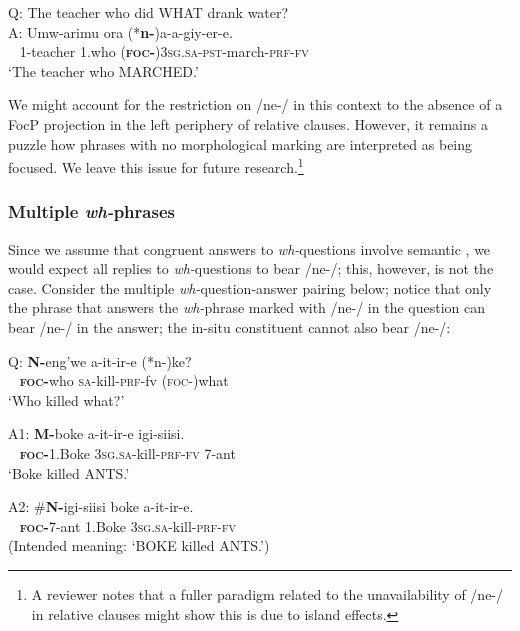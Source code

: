 \documentclass[output=paper,modfonts]{langscibook}
\begin{document}
\ea\label{ex:landmann:46}
Q: The teacher who did WHAT drank water?\\
\gll A: Umw-arimu ora (*\textbf{n-})a-a-giy-er-e.\\
     ~ 1-teacher 1.who (\textsc{\textbf{foc-}})\textsc{3sg}.\textsc{sa}-\textsc{pst}-march-\textsc{prf}-\textsc{fv}\\
\glt ‘The teacher who MARCHED.’
\z

We might account for the restriction on /ne-/ in this context to the absence of a FocP projection in the left periphery of relative clauses. However, it remains a puzzle how phrases with no morphological marking are interpreted as being focused. We leave this issue for future research.\footnote{A reviewer notes that a fuller paradigm related to the unavailability of /ne-/ in relative clauses might show this is due to island effects.}


 \subsubsection{Multiple \textit{wh-}phrases}


Since we assume that congruent answers to \textit{wh-}questions involve semantic , we would expect all replies to \textit{wh-}questions to bear /ne-/; this, however, is not the case. Consider the multiple \textit{wh-}question-answer pairing below; notice that only the phrase that answers the \textit{wh-}phrase marked with /ne-/ in the question can bear /ne-/ in the answer; the in-situ constituent cannot also bear /ne-/:


\ea\label{ex:landmann:47}
 \gll Q: \textbf{N-}eng’we a-it-ir-e (*n-)ke?\\
    ~ \textsc{\textbf{foc-}}who \textsc{sa}-kill-\textsc{prf}-fv (\textsc{foc}-)what\\
\glt ‘Who killed what?’
\z

\ea\label{ex:landmann:48}
\gll A1: \textbf{M-}boke a-it-ir-e igi-siisi.\\
    ~ \textsc{\textbf{foc-}}1.Boke \textsc{3sg}.\textsc{sa}-kill-\textsc{prf}-\textsc{fv} 7-ant\\
\glt ‘Boke killed ANTS.’
\z

\ea\label{ex:landmann:49}
\gll A2: \#\textbf{N-}igi-siisi boke a-it-ir-e.\\
    ~ \textsc{\textbf{foc-}}7-ant 1.Boke \textsc{3sg}.\textsc{sa}-kill-\textsc{prf}-\textsc{fv}\\
\glt (Intended meaning: ‘BOKE killed ANTS.’)
\z
\end{document}
